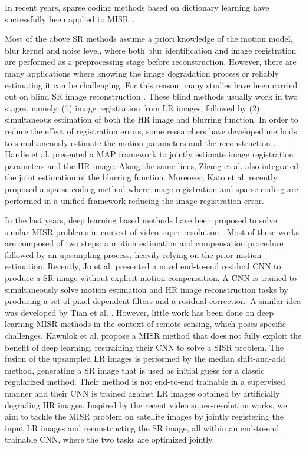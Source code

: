 \documentclass[journal]{IEEEtran}
\begin{document}
In recent years, sparse coding methods based on dictionary learning have successfully been applied to MISR \cite{Kato:2017:DSM:3066426.3066466, KATO201564}. 

Most of the above SR methods assume a priori knowledge of the motion model, blur kernel and noise level, where both blur identification and image registration are performed as a preprocessing stage before reconstruction. However, there are many applications where knowing the image degradation process or reliably estimating it can be challenging. For this reason, many studies have been carried out on blind SR image reconstruction \cite{941854,He2005ARF}. These blind methods usually work in two stages, namely, (1) image registration from LR images, followed by (2) simultaneous estimation of both the HR image and blurring function. In order to reduce the effect of registration errors, some researchers have developed methods to simultaneously estimate the motion parameters and the reconstruction \cite{650116,Zhang2015}. Hardie et al. \cite{650116} presented a  MAP framework to jointly estimate image registration parameters and the HR image. Along the same lines, Zhang et al. \cite{Zhang2015} also integrated the joint estimation of the blurring function.
Moreover, Kato et al. \cite{Kato:2017:DSM:3066426.3066466} recently proposed a sparse coding method where image registration and sparse coding are performed in a unified framework reducing the image registration error. 

In the last years, deep learning based methods have been proposed to solve similar MISR problems in context of video super-resolution \cite{7444187,DBLP:journals/corr/CaballeroLAATWS16}. Most of these works are composed of two steps: a motion estimation and compensation procedure followed by an upsampling process, heavily relying on the prior motion estimation. Recently, Jo et al. \cite{Jo_2018_CVPR} presented a novel end-to-end residual  CNN  to produce a SR image without explicit motion compensation. A CNN is trained to simultaneously solve motion estimation and HR image reconstruction tasks by producing a set of pixel-dependent filters and a residual correction. A similar idea was developed by Tian et al. \cite{Tian2018TDANTD}. However, little work has been done on deep learning MISR methods in the context of remote sensing, which poses specific challenges. Kawulok et al. \cite{SuperDeep_MISR} propose a MISR method that does not fully exploit the benefit of deep learning, restraining their CNN to solve a SISR problem. The fusion of the upsampled LR images is performed by the median shift-and-add method, generating a SR image that is used as initial guess for a classic regularized method. Their method is not end-to-end trainable in a supervised manner and their CNN is trained against LR images obtained by artificially degrading HR images.
Inspired by the recent video super-resolution works, we aim to tackle the MISR problem on satellite images by jointly registering the input LR images and reconstructing the SR image, all within an end-to-end trainable CNN, where the two tasks are optimized jointly. 
\end{document}
